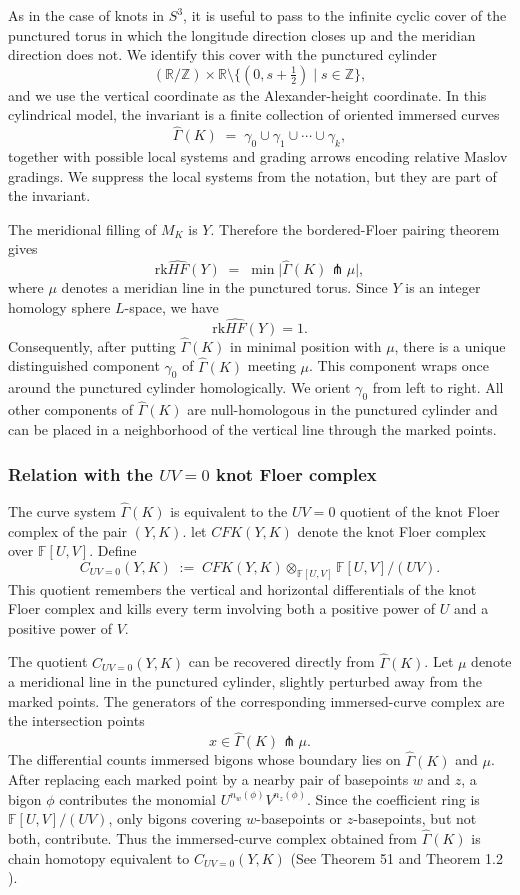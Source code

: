 \documentclass[12pt]{amsart}
\theoremstyle{definition}
\theoremstyle{definition}
\newcommand{\F}{{\mathbb{F}}}
\newcommand{\R}{{\mathbb{R}}}
\newcommand{\Z}{{\mathbb{Z}}}
\newcommand{\rk}{\text{rk}}
\newcommand{\Gh}{\widehat{\Gamma}}
\begin{document}
As in the case of knots in $S^3$, it is useful to pass to the infinite cyclic
cover of the punctured torus in which the longitude direction closes up and the
meridian direction does not. We identify this cover with the punctured cylinder
\[
(\R/\Z)\times \R \setminus \{(0,s+\tfrac12)\mid s\in \Z\},
\]
and we use the vertical coordinate as the Alexander-height coordinate. In this
cylindrical model, the invariant is a finite collection of oriented immersed
curves
\[
\Gh(K) \;=\; \gamma_0 \cup \gamma_1 \cup \cdots \cup \gamma_k,
\]
together with possible local systems and grading arrows encoding relative
Maslov gradings. We suppress the local systems from the notation, but they are
part of the invariant.

The meridional filling of $M_K$ is $Y$. Therefore the bordered-Floer pairing
theorem gives
\[
\rk \widehat{HF}(Y)
\;=\;
\min \bigl|\Gh(K)\pitchfork \mu\bigr|,
\]
where $\mu$ denotes a meridian line in the punctured torus. Since $Y$ is an
integer homology sphere $L$-space, we have
\[
\rk \widehat{HF}(Y)=1.
\]
Consequently, after putting $\Gh(K)$ in minimal position with $\mu$, there is a
unique distinguished component $\gamma_0$ of $\Gh(K)$ meeting $\mu$. This
component wraps once around the punctured cylinder homologically. We orient
$\gamma_0$ from left to right. All other components of $\Gh(K)$ are
null-homologous in the punctured cylinder and can be placed in a neighborhood
of the vertical line through the marked points.

\subsubsection*{Relation with the $UV=0$ knot Floer complex}

The curve system $\Gh(K)$ is equivalent to the $UV=0$ quotient of the knot
Floer complex of the pair $(Y,K)$. let $CFK(Y,K)$ denote the
knot Floer complex over $\F[U,V]$. Define
\[
C_{UV=0}(Y,K)
\;:=\;
CFK(Y,K)\otimes_{\F[U,V]} \F[U,V]/(UV).
\]
This quotient remembers the vertical and horizontal differentials of the knot
Floer complex and kills every term involving both a positive power of $U$ and a
positive power of $V$.

The quotient $C_{UV=0}(Y,K)$ can be recovered directly from $\Gh(K)$. Let
$\mu$ denote a meridional line in the punctured cylinder, slightly perturbed
away from the marked points. The generators of the corresponding immersed-curve
complex are the intersection points
\[
x \in \Gh(K)\pitchfork \mu.
\]
The differential counts immersed bigons whose boundary lies on $\Gh(K)$ and
$\mu$. After replacing each marked point by a nearby pair of basepoints
$w$ and $z$, a bigon $\phi$ contributes the monomial
$
U^{n_w(\phi)}V^{n_z(\phi)}$. Since the coefficient ring is $\F[U,V]/(UV)$, only bigons covering $w$-basepoints
or $z$-basepoints, but not both, contribute. Thus the immersed-curve complex
obtained from $\Gh(K)$ is chain homotopy equivalent to
$C_{UV=0}(Y,K)$ (See Theorem 51 \cite{HRW2} and Theorem 1.2 \cite{hanselman2023knotfloerhomologyimmersed}).
\end{document}
